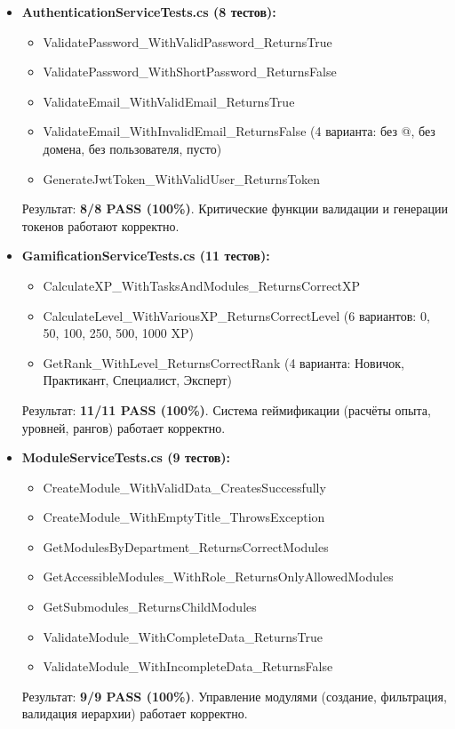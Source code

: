 \begin{itemize}
	\item \textbf{AuthenticationServiceTests.cs (8 тестов):}
	\begin{itemize}
		\item ValidatePassword\_WithValidPassword\_ReturnsTrue
		\item ValidatePassword\_WithShortPassword\_ReturnsFalse
		\item ValidateEmail\_WithValidEmail\_ReturnsTrue
		\item ValidateEmail\_WithInvalidEmail\_ReturnsFalse (4 варианта: без @, без домена, без пользователя, пусто)
		\item GenerateJwtToken\_WithValidUser\_ReturnsToken
	\end{itemize}
	Результат: \textbf{8/8 PASS (100\%)}. Критические функции валидации и генерации токенов работают корректно.
	
	\item \textbf{GamificationServiceTests.cs (11 тестов):}
	\begin{itemize}
		\item CalculateXP\_WithTasksAndModules\_ReturnsCorrectXP
		\item CalculateLevel\_WithVariousXP\_ReturnsCorrectLevel (6 вариантов: 0, 50, 100, 250, 500, 1000 XP)
		\item GetRank\_WithLevel\_ReturnsCorrectRank (4 варианта: Новичок, Практикант, Специалист, Эксперт)
	\end{itemize}
	Результат: \textbf{11/11 PASS (100\%)}. Система геймификации (расчёты опыта, уровней, рангов) работает корректно.
	
	\item \textbf{ModuleServiceTests.cs (9 тестов):}
	\begin{itemize}
		\item CreateModule\_WithValidData\_CreatesSuccessfully
		\item CreateModule\_WithEmptyTitle\_ThrowsException
		\item GetModulesByDepartment\_ReturnsCorrectModules
		\item GetAccessibleModules\_WithRole\_ReturnsOnlyAllowedModules
		\item GetSubmodules\_ReturnsChildModules
		\item ValidateModule\_WithCompleteData\_ReturnsTrue
		\item ValidateModule\_WithIncompleteData\_ReturnsFalse
	\end{itemize}
	Результат: \textbf{9/9 PASS (100\%)}. Управление модулями (создание, фильтрация, валидация иерархии) работает корректно.
\end{itemize}

